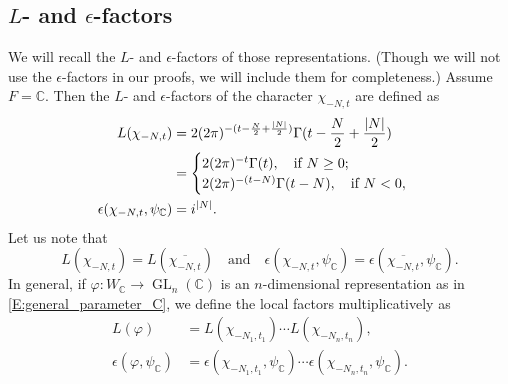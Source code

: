 \documentclass[11pt]{amsart}
\theoremstyle{plain}
\theoremstyle{definition}
\numberwithin{equation}{section}
\newcommand{\C}{\mathbb C}
\newcommand{\GL}{\operatorname{GL}}
\begin{document}
\subsection{$L$- and $\epsilon$-factors}
We will recall the $L$- and $\epsilon$-factors of those
representations. (Though we will not use the $\epsilon$-factors in our
proofs, we will include them for completeness.)
Assume $F=\C$. Then the $L$- and $\epsilon$-factors of the character
$\chi_{-N,t}$ are defined as
\begin{align}
\notag L(\chi_{-N, t})&=2(2\pi)^{-(t-\frac{N}{2}+\frac{|N|}{2})}\Gamma(t-\frac{N}{2}+\frac{|N|}{2})\\
\label{E:L-factor-C}&=\begin{cases}2(2\pi)^{-t}\Gamma(t),\quad\text{if
    $N\geq 0$};\\
2(2\pi)^{-(t-N)}\Gamma(t-N),\quad\text{if $N<0$},
\end{cases}\\
\label{E:ep-factor-C}\epsilon(\chi_{-N,t},\psi_\C)&=i^{|N|}.
\end{align}
Let us note that
\begin{equation*}
L(\chi_{-N, t})=L(\overline{\chi_{-N, t}})\quad\text{and}\quad
\epsilon(\chi_{-N,t},\psi_\C)=\epsilon(\overline{\chi_{-N,t}},\psi_\C).
\end{equation*}
In general, if $\varphi:W_\C\rightarrow\GL_n(\C)$ is an
$n$-dimensional representation as in \eqref{E:general_parameter_C}, we
define the local factors multiplicatively as
\begin{align*}
L(\varphi)&=L(\chi_{-N_1,t_1})\cdots L(\chi_{-N_n, t_n}),\\
\epsilon(\varphi,\psi_\C)
&=\epsilon(\chi_{-N_1,t_1}, \psi_\C)\cdots\epsilon(\chi_{-N_n, t_n}, \psi_\C).
\end{align*}
\end{document}
